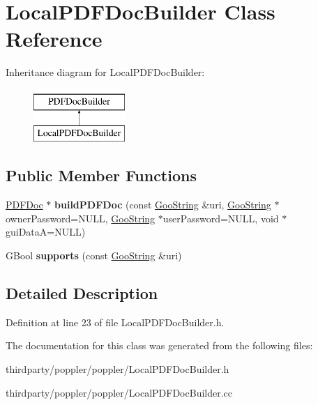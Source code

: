 \hypertarget{class_local_p_d_f_doc_builder}{}\section{Local\+P\+D\+F\+Doc\+Builder Class Reference}
\label{class_local_p_d_f_doc_builder}
Inheritance diagram for Local\+P\+D\+F\+Doc\+Builder\+:\begin{figure}[H]
\begin{center}
\leavevmode
\includegraphics[height=2.000000cm]{class_local_p_d_f_doc_builder}
\end{center}
\end{figure}
\subsection*{Public Member Functions}
\begin{DoxyCompactItemize}
\item 
\mbox{\label{class_local_p_d_f_doc_builder_a22734f883ba6ebb31249b694ffdd06a8}} 
\hyperlink{class_p_d_f_doc}{P\+D\+F\+Doc} $\ast$ {\bfseries build\+P\+D\+F\+Doc} (const \hyperlink{class_goo_string}{Goo\+String} \&uri, \hyperlink{class_goo_string}{Goo\+String} $\ast$owner\+Password=N\+U\+LL, \hyperlink{class_goo_string}{Goo\+String} $\ast$user\+Password=N\+U\+LL, void $\ast$gui\+DataA=N\+U\+LL)
\item 
\mbox{\label{class_local_p_d_f_doc_builder_a9178f6ed1fcd87926424b78ce9cb30ab}} 
G\+Bool {\bfseries supports} (const \hyperlink{class_goo_string}{Goo\+String} \&uri)
\end{DoxyCompactItemize}


\subsection{Detailed Description}


Definition at line 23 of file Local\+P\+D\+F\+Doc\+Builder.\+h.



The documentation for this class was generated from the following files\+:\begin{DoxyCompactItemize}
\item 
thirdparty/poppler/poppler/Local\+P\+D\+F\+Doc\+Builder.\+h\item 
thirdparty/poppler/poppler/Local\+P\+D\+F\+Doc\+Builder.\+cc\end{DoxyCompactItemize}
